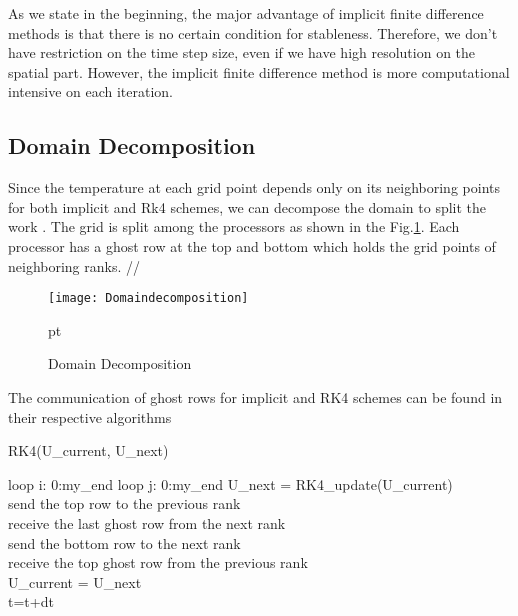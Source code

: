 \documentclass[10pt,a4paper]{report}
\begin{document}
As we state in the beginning, the major advantage of implicit finite difference methods is that there is no certain condition for stableness. Therefore, we don't have restriction on the time step size, even if we have high resolution on the spatial part. However, the implicit finite difference method is more computational intensive on each iteration.





\subsection{Domain Decomposition}

Since the temperature at each grid point depends only on its neighboring points for both implicit and Rk4 schemes, we can decompose the domain to split the work . The grid is split among the processors as shown in the Fig.\ref{fig:domain}. Each processor has a ghost row at the top and bottom which holds the grid points of neighboring ranks. // 

\begin{figure}[h]
\begin{center}
\texttt{[image: Domaindecomposition]} 
\caption{Domain Decomposition}  pt
\label{fig:domain}
\end{center}
\end{figure}


The communication of ghost rows for implicit and RK4 schemes can be found in their respective algorithms

\begin{algorithm}[h]
\caption{RK4(U\_current, U\_next)}
  
  {

	loop i: 0:my\_end\;	
    \Indp loop j: 0:my\_end\;
      	\Indp U\_next = RK4\_update(U\_current)\\
    \bigskip 
    \Indm \Indm send the top row to the previous rank\\
	receive the last ghost row from the next rank\\
	\bigskip 		
	send the bottom row to the next rank\\
	receive the top ghost row from the previous rank\\   
	\bigskip
	U\_current = U\_next\\
    t=t+dt
  }

\end{algorithm}
\end{document}
